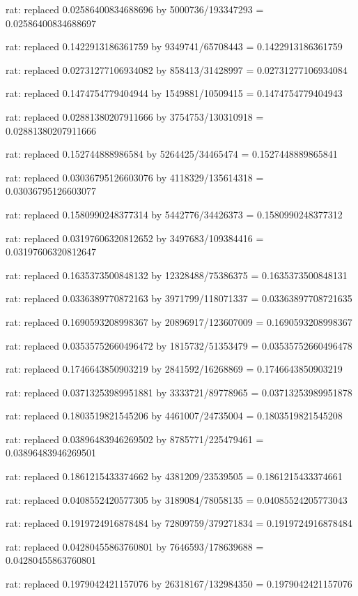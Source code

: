 \documentclass[a4paper,10pt]{article}
\begin{document}
\begin{eulernotebook}
\begin{eulercomment}
\begin{eulercomment}
\begin{eulercomment}
\begin{eulercomment}
\begin{eulercomment}
\begin{eulercomment}
\begin{eulercomment}
\begin{eulercomment}
\begin{eulercomment}
\begin{eulercomment}
\begin{eulercomment}
\begin{eulercomment}
\begin{eulercomment}
\begin{eulercomment}
\begin{eulercomment}
\begin{eulercomment}
\begin{euleroutput}
  rat: replaced 0.02586400834688696 by 5000736/193347293 = 0.02586400834688697
  
  rat: replaced 0.1422913186361759 by 9349741/65708443 = 0.1422913186361759
  
  rat: replaced 0.02731277106934082 by 858413/31428997 = 0.02731277106934084
  
  rat: replaced 0.1474754779404944 by 1549881/10509415 = 0.1474754779404943
  
  rat: replaced 0.02881380207911666 by 3754753/130310918 = 0.02881380207911666
  
  rat: replaced 0.152744888986584 by 5264425/34465474 = 0.1527448889865841
  
  rat: replaced 0.03036795126603076 by 4118329/135614318 = 0.03036795126603077
  
  rat: replaced 0.1580990248377314 by 5442776/34426373 = 0.1580990248377312
  
  rat: replaced 0.03197606320812652 by 3497683/109384416 = 0.03197606320812647
  
  rat: replaced 0.1635373500848132 by 12328488/75386375 = 0.1635373500848131
  
  rat: replaced 0.0336389770872163 by 3971799/118071337 = 0.03363897708721635
  
  rat: replaced 0.1690593208998367 by 20896917/123607009 = 0.1690593208998367
  
  rat: replaced 0.03535752660496472 by 1815732/51353479 = 0.03535752660496478
  
  rat: replaced 0.1746643850903219 by 2841592/16268869 = 0.1746643850903219
  
  rat: replaced 0.03713253989951881 by 3333721/89778965 = 0.03713253989951878
  
  rat: replaced 0.1803519821545206 by 4461007/24735004 = 0.1803519821545208
  
  rat: replaced 0.03896483946269502 by 8785771/225479461 = 0.03896483946269501
  
  rat: replaced 0.1861215433374662 by 4381209/23539505 = 0.1861215433374661
  
  rat: replaced 0.0408552420577305 by 3189084/78058135 = 0.04085524205773043
  
  rat: replaced 0.1919724916878484 by 72809759/379271834 = 0.1919724916878484
  
  rat: replaced 0.04280455863760801 by 7646593/178639688 = 0.04280455863760801
  
  rat: replaced 0.1979042421157076 by 26318167/132984350 = 0.1979042421157076
  

\end{euleroutput}
\end{eulercomment}
\end{eulercomment}
\end{eulercomment}
\end{eulercomment}
\end{eulercomment}
\end{eulercomment}
\end{eulercomment}
\end{eulercomment}
\end{eulercomment}
\end{eulercomment}
\end{eulercomment}
\end{eulercomment}
\end{eulercomment}
\end{eulercomment}
\end{eulercomment}
\end{eulercomment}
\end{eulernotebook}
\end{document}
